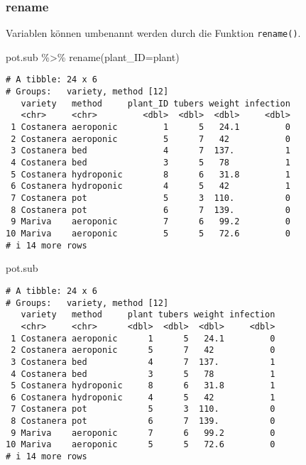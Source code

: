 \documentclass[
  letterpaper,
  DIV=11,
  numbers=noendperiod]{scrartcl}
\newenvironment{Shaded}{\begin{snugshade}}{\end{snugshade}}
\newcommand{\AttributeTok}[1]{\textcolor[rgb]{0.40,0.45,0.13}{#1}}
\newcommand{\FunctionTok}[1]{\textcolor[rgb]{0.28,0.35,0.67}{#1}}
\newcommand{\NormalTok}[1]{\textcolor[rgb]{0.00,0.23,0.31}{#1}}
\newcommand{\SpecialCharTok}[1]{\textcolor[rgb]{0.37,0.37,0.37}{#1}}
\begin{document}
\hypertarget{rename}{%
\subsubsection{rename}\label{rename}}

Variablen können umbenannt werden durch die Funktion \texttt{rename()}.

\begin{Shaded}
\begin{Highlighting}[]
\NormalTok{pot.sub }\SpecialCharTok{\%\textgreater{}\%} \FunctionTok{rename}\NormalTok{(}\AttributeTok{plant\_ID=}\NormalTok{plant)}
\end{Highlighting}
\end{Shaded}

\begin{verbatim}
# A tibble: 24 x 6
# Groups:   variety, method [12]
   variety   method     plant_ID tubers weight infection
   <chr>     <chr>         <dbl>  <dbl>  <dbl>     <dbl>
 1 Costanera aeroponic         1      5   24.1         0
 2 Costanera aeroponic         5      7   42           0
 3 Costanera bed               4      7  137.          1
 4 Costanera bed               3      5   78           1
 5 Costanera hydroponic        8      6   31.8         1
 6 Costanera hydroponic        4      5   42           1
 7 Costanera pot               5      3  110.          0
 8 Costanera pot               6      7  139.          0
 9 Mariva    aeroponic         7      6   99.2         0
10 Mariva    aeroponic         5      5   72.6         0
# i 14 more rows
\end{verbatim}

\begin{Shaded}
\begin{Highlighting}[]
\NormalTok{pot.sub}
\end{Highlighting}
\end{Shaded}

\begin{verbatim}
# A tibble: 24 x 6
# Groups:   variety, method [12]
   variety   method     plant tubers weight infection
   <chr>     <chr>      <dbl>  <dbl>  <dbl>     <dbl>
 1 Costanera aeroponic      1      5   24.1         0
 2 Costanera aeroponic      5      7   42           0
 3 Costanera bed            4      7  137.          1
 4 Costanera bed            3      5   78           1
 5 Costanera hydroponic     8      6   31.8         1
 6 Costanera hydroponic     4      5   42           1
 7 Costanera pot            5      3  110.          0
 8 Costanera pot            6      7  139.          0
 9 Mariva    aeroponic      7      6   99.2         0
10 Mariva    aeroponic      5      5   72.6         0
# i 14 more rows
\end{verbatim}
\end{document}
